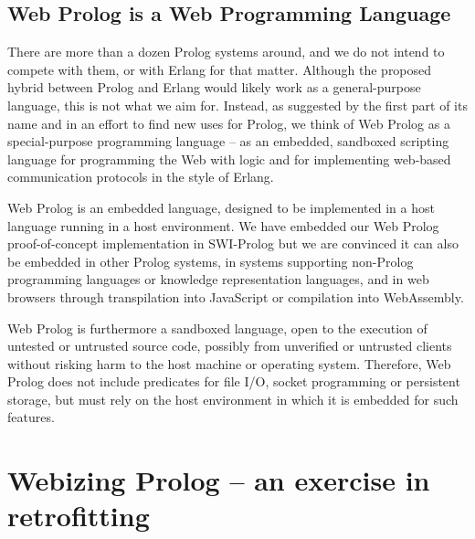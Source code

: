 \documentclass{tlp}
\begin{document}
\subsection{Web Prolog is a Web Programming Language}\label{sec:hybrid}

\noindent There are more than a dozen Prolog systems around, and we do not intend to compete with them, or with Erlang for that matter. Although the proposed hybrid between Prolog and Erlang would likely work as a general-purpose language, this is not what we aim for. Instead, as suggested by the first part of its name and in an effort to find new uses for Prolog, we think of Web Prolog as a special-purpose programming language -- as an embedded, sandboxed scripting language for programming the Web with logic and for implementing web-based communication protocols in the style of Erlang.


Web Prolog is an embedded language, designed to be implemented in a host language running in a host environment. We have embedded our Web Prolog proof-of-concept implementation in SWI-Prolog \cite{wielemaker:2011:tplp} but we are convinced it can also be embedded in other Prolog systems, in systems supporting non-Prolog programming languages or knowledge representation languages, and in web browsers through transpilation into JavaScript or compilation into WebAssembly.

Web Prolog is furthermore a sandboxed language, open to the execution of untested or untrusted source code, possibly from unverified or untrusted clients without risking harm to the host machine or operating system. Therefore, Web Prolog does not include predicates for file I/O, socket programming or persistent storage, but must rely on the host environment in which it is embedded for such features.

\section{Webizing Prolog -- an exercise in
retrofitting}\label{sec:webizing-prolog}
\end{document}
